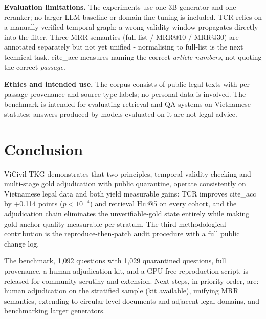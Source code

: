 \documentclass[10pt,a4paper,twocolumn]{article}
\newcommand{\hit}{\textsc{Hit}}
\begin{document}
\textbf{Evaluation limitations.} The experiments use one 3B generator and one reranker; no larger LLM baseline or domain fine-tuning is included. TCR relies on a manually verified temporal graph; a wrong validity window propagates directly into the filter. Three MRR semantics (full-list / MRR@10 / MRR@30) are annotated separately but not yet unified - normalising to full-list is the next technical task. cite\_acc measures naming the correct \emph{article numbers}, not quoting the correct \emph{passage}.

\textbf{Ethics and intended use.} The corpus consists of public legal texts with per-passage provenance and source-type labels; no personal data is involved. The benchmark is intended for evaluating retrieval and QA systems on Vietnamese statutes; answers produced by models evaluated on it are not legal advice.

\section{Conclusion}

ViCivil-TKG demonstrates that two principles, temporal-validity checking and multi-stage gold adjudication with public quarantine, operate consistently on Vietnamese legal data and both yield measurable gains: TCR improves cite\_acc by +0.114 points ($p<10^{-4}$) and retrieval \hit{}@5 on every cohort, and the adjudication chain eliminates the unverifiable-gold state entirely while making gold-anchor quality measurable per stratum. The third methodological contribution is the reproduce-then-patch audit procedure with a full public change log.

The benchmark, 1,092 questions with 1,029 quarantined questions, full provenance, a human adjudication kit, and a GPU-free reproduction script, is released for community scrutiny and extension. Next steps, in priority order, are: human adjudication on the stratified sample (kit available), unifying MRR semantics, extending to circular-level documents and adjacent legal domains, and benchmarking larger generators.
\end{document}
